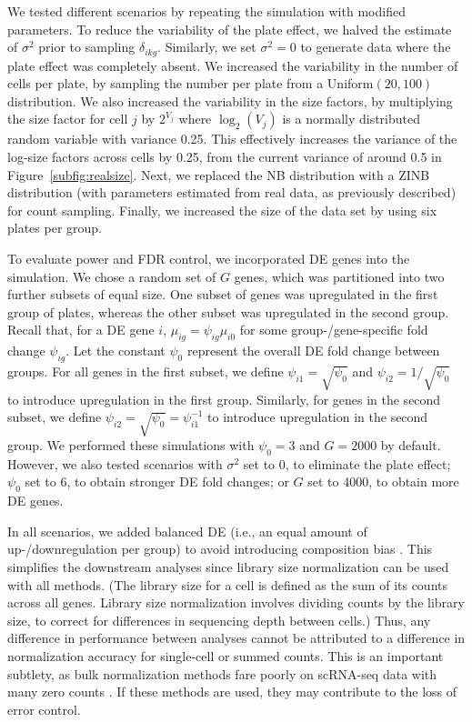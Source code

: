 \documentclass{article}
\begin{document}
We tested different scenarios by repeating the simulation with modified parameters.
To reduce the variability of the plate effect, we halved the estimate of $\sigma^2$ prior to sampling $\delta_{ikg}$.
Similarly, we set $\sigma^2=0$ to generate data where the plate effect was completely absent.
We increased the variability in the number of cells per plate, by sampling the number per plate from a Uniform$(20, 100)$ distribution.
We also increased the variability in the size factors, by multiplying the size factor for cell $j$ by $2^{V_j}$ where $\log_2(V_j)$ is a normally distributed random variable with variance 0.25.
This effectively increases the variance of the log-size factors across cells by 0.25, from the current variance of around 0.5 in Figure~\ref{subfig:realsize}.
Next, we replaced the NB distribution with a ZINB distribution (with parameters estimated from real data, as previously described) for count sampling.
Finally, we increased the size of the data set by using six plates per group.

To evaluate power and FDR control, we incorporated DE genes into the simulation.
We chose a random set of $G$ genes, which was partitioned into two further subsets of equal size.
One subset of genes was upregulated in the first group of plates, whereas the other subset was upregulated in the second group.
Recall that, for a DE gene $i$, $\mu_{ig} = \psi_{ig}\mu_{i0}$ for some group-/gene-specific fold change $\psi_{ig}$.
Let the constant $\psi_0$ represent the overall DE fold change between groups.
For all genes in the first subset, we define $\psi_{i1} = \sqrt{\psi_0}$ and $\psi_{i2} = 1/\sqrt{\psi_0}$ to introduce upregulation in the first group.
Similarly, for genes in the second subset, we define $\psi_{i2} = \sqrt{\psi_0} = \psi_{i1}^{-1}$ to introduce upregulation in the second group.
We performed these simulations with $\psi_0=3$ and $G=2000$ by default.
However, we also tested scenarios with $\sigma^2$ set to 0, to eliminate the plate effect; $\psi_0$ set to 6, to obtain stronger DE fold changes; or $G$ set to 4000, to obtain more DE genes.

In all scenarios, we added balanced DE (i.e., an equal amount of up-/downregulation per group) to avoid introducing composition bias \citep{robinson2010scaling}.
This simplifies the downstream analyses since library size normalization can be used with all methods.
(The library size for a cell is defined as the sum of its counts across all genes.
Library size normalization involves dividing counts by the library size, to correct for differences in sequencing depth between cells.)
Thus, any difference in performance between analyses cannot be attributed to a difference in normalization accuracy for single-cell or summed counts.
This is an important subtlety, as bulk normalization methods fare poorly on scRNA-seq data with many zero counts \citep{lun2016pooling}.
If these methods are used, they may contribute to the loss of error control.
\end{document}

